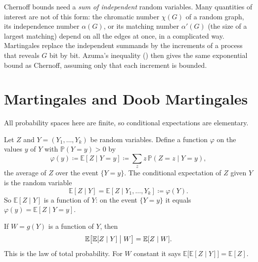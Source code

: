 Chernoff bounds need a \emph{sum of independent} random variables. Many quantities of interest are not of this form: the chromatic number \(\chi(G)\) of a random graph, its independence number \(\alpha(G)\), or its matching number \(\alpha'(G)\) (the size of a largest matching) depend on all the edges at once, in a complicated way. Martingales replace the independent summands by the increments of a process that reveals \(G\) bit by bit. Azuma's inequality () then gives the same exponential bound as Chernoff, assuming only that each increment is bounded.

\section{Martingales and Doob Martingales}\label{sec:martingales}

All probability spaces here are finite, so conditional expectations are elementary.

\begin{notation}\label{nota:conditional-expectation}
    Let \(Z\) and \(Y = (Y_{1}, \ldots, Y_{k})\) be random variables. Define a function \(\varphi\) on the values \(y\) of \(Y\) with \(\mathbb{P}(Y = y) > 0\) by
    \[
        \varphi(y) \coloneqq \mathbb{E}[Z \mid Y = y] \coloneqq \sum_{z} z \, \mathbb{P}(Z = z \mid Y = y) ,
    \]
    the average of \(Z\) over the event \(\{ Y = y \}\). The conditional expectation of \(Z\) given \(Y\) is the random variable
    \[
        \mathbb{E}[Z \mid Y] = \mathbb{E}[Z \mid Y_{1}, \ldots, Y_{k}] \coloneqq \varphi(Y) .
    \]
    So \(\mathbb{E}[Z \mid Y]\) is a function of \(Y\): on the event \(\{ Y = y \}\) it equals \(\varphi(y) = \mathbb{E}[Z \mid Y = y]\).
\end{notation}

\begin{fact}\label{fact:tower}
    If \(W = g(Y)\) is a function of \(Y\), then
    \[
        \mathbb{E}\bigl[ \mathbb{E}[Z \mid Y] \bigm| W \bigr] = \mathbb{E}[Z \mid W] .
    \]
    This is the law of total probability. For \(W\) constant it says \(\mathbb{E}\bigl[ \mathbb{E}[Z \mid Y] \bigr] = \mathbb{E}[Z]\).
\end{fact}

